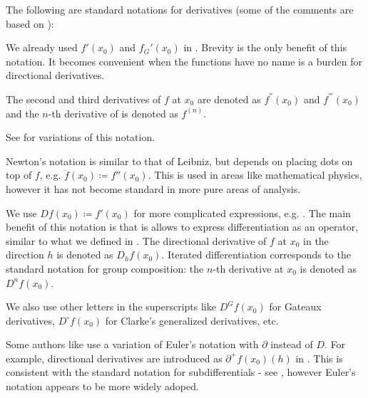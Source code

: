 \begin{remark}\label{rem:derivative_notation}
  The following are standard notations for derivatives (some of the comments are based on \cite[146]{ФихтенгольцОсновыТом2}):
  \begin{thmenum}
     We already used  \( f'(x_0) \) and \( f_G'(x_0) \) in . Brevity is the only benefit of this notation. It becomes convenient when the functions have no name is a burden for directional derivatives.

    The second and third derivatives of \( f \) at \( x_0 \) are denoted as \( f^{''}(x_0) \) and \( f^{'''}(x_0) \) and the \( n \)-th derivative of is denoted as \( f^{(n)} \).

    See  for variations of this notation.

     Newton's notation is similar to that of Leibniz, but depends on placing dots on top of \( f \), e.g. \( \ddot{f}(x_0) \coloneqq f''(x_0) \). This is used in areas like mathematical physics, however it has not become standard in more pure areas of analysis.

     We use  \( Df(x_0) \coloneqq f'(x_0) \) for more complicated expressions, e.g. . The main benefit of this notation is that is allows to express differentiation as an operator, similar to what we defined in . The directional derivative of \( f \) at \( x_0 \) in the direction \( h \) is denoted as \( D_h f(x_0) \). Iterated differentiation corresponds to the standard notation for group composition: the \( n \)-th derivative at \( x_0 \) is denoted as \( D^n f(x_0) \).

    We also use other letters in the superscripts like \( D^G f(x_0) \) for Gateaux derivatives, \( D^\circ f(x_0) \) for Clarke's generalized derivatives, etc.

     Some authors like \cite{Phelps1993} use a variation of Euler's notation with \( \partial \) instead of \( D \). For example, directional derivatives are introduced as \( \partial^+ f(x_0)(h) \) in \cite[lemma 1.2]{Phelps1993}. This is consistent with the standard notation for subdifferentials - see , however Euler's notation appears to be more widely adoped.


\end{thmenum}
\end{remark}
